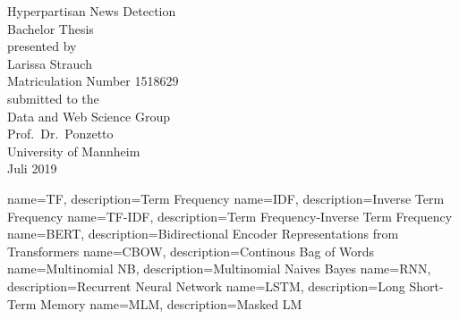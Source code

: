 \documentclass[a4paper, 11pt,titlepage,oneside,openany]{book}
\begin{document}
\begin{titlepage}
	\vspace*{2cm}
  \begin{center}
   {\Large Hyperpartisan News Detection\\}
   \vspace{2cm} 
   {Bachelor Thesis\\}
   \vspace{2cm}
   {presented by\\
    Larissa Strauch \\
    Matriculation Number 1518629\\
   }
   \vspace{1cm} 
   {submitted to the\\
    Data and Web Science Group\\
    Prof.\ Dr.\ Ponzetto\\
    University of Mannheim\\} \vspace{2cm}
   {Juli 2019}
  \end{center}
\end{titlepage} 

\tableofcontents
\newpage

\listofalgorithms
\listoffigures

\listoftables

{
	name=TF,
	description={Term Frequency}
}
{
	name=IDF,
	description={Inverse Term Frequency}
}
{
	name=TF-IDF,
	description={Term Frequency-Inverse Term Frequency}
}
{
	name=BERT,
	description={Bidirectional Encoder Representations from Transformers}
}
{
	name=CBOW,
	description={Continous Bag of Words}
}
{
	name=Multinomial NB,
	description={Multinomial Naives Bayes}
}
{
	name=RNN,
	description={Recurrent Neural Network}
}
{
	name=LSTM,
	description={Long Short-Term Memory}
}
{
	name=MLM,
	description={Masked LM}
}


\printglossaries %


\newpage
\end{document}

